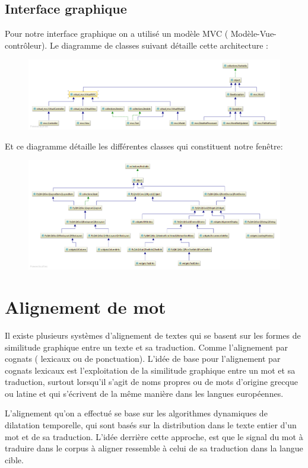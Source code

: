 \documentclass[11pt, oneside]{article}   	%
\begin{document}
\subsection{Interface graphique}
Pour notre interface graphique on a utilisé un modèle MVC ( Modèle-Vue-contrôleur). Le diagramme de classes suivant détaille cette architecture :

\begin{figure}[h!]
\centering
\includegraphics[width = 500pt]{mvc.png}
\end{figure}

Et ce diagramme détaille les différentes classes qui constituent notre fenêtre:

\begin{figure}[h!]
\centering
\includegraphics[width = 500pt]{widget.png}
\end{figure}


\section{Alignement de mot}
Il existe plusieurs systèmes d'alignement de textes qui se basent sur les formes de similitude graphique entre un texte et sa traduction. Comme l'alignement par cognats ( lexicaux ou de ponctuation). L'idée de base pour l'alignement par cognats lexicaux est l'exploitation de la similitude graphique entre un mot et sa traduction, surtout lorsqu'il s'agit de noms propres ou de mots d'origine grecque ou latine et qui s'écrivent de la même manière dans les langues européennes. 

L'alignement qu'on a effectué se base sur les algorithmes dynamiques de dilatation temporelle, qui sont basés sur la distribution dans le texte entier d'un mot et de sa traduction. L'idée derrière cette approche, est que le signal du mot à traduire dans le corpus à aligner ressemble à celui de sa traduction dans la langue cible.
\end{document}
